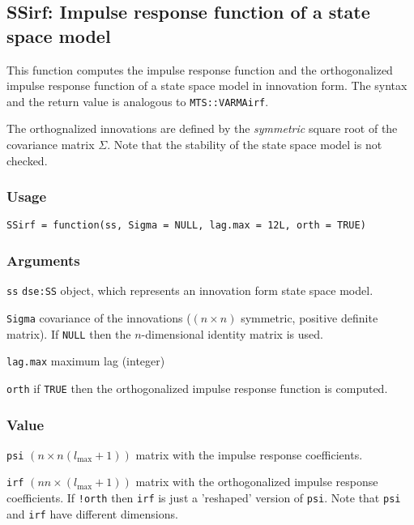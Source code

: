 \documentclass[]{article}
\begin{document}
\subsection{SSirf: Impulse response function of a state space
model}\label{ssirf-impulse-response-function-of-a-state-space-model}

This function computes the impulse response function and the
orthogonalized impulse response function of a state space model in
innovation form. The syntax and the return value is analogous to
\texttt{MTS::VARMAirf}.

The orthognalized innovations are defined by the \emph{symmetric} square
root of the covariance matrix \(\Sigma\). Note that the stability of the
state space model is not checked.

\subsubsection*{Usage}\begin{verbatim}
SSirf = function(ss, Sigma = NULL, lag.max = 12L, orth = TRUE)
\end{verbatim}\subsubsection*{Arguments}\begin{description}
\item \texttt{ss} \texttt{dse:SS} object, which represents an innovation
           form state space model.
\item \texttt{Sigma} covariance of the innovations 
             ($(n\times n)$ symmetric, positive definite matrix).
             If \texttt{NULL} then the $n$-dimensional identity matrix is used.
\item \texttt{lag.max} maximum lag (integer)
\item \texttt{orth} if \texttt{TRUE} then the orthogonalized impulse response 
             function is computed.
\end{description}\subsubsection*{Value}\begin{description}
\item \texttt{psi} $(n\times n(l_{\mbox{max}}+1))$ matrix with the 
       impulse response coefficients.
\item \texttt{irf} $(nn\times (l_{\mbox{max}}+1))$ matrix with the 
       orthogonalized impulse response coefficients. If \texttt{!orth} 
       then \texttt{irf} is just a 'reshaped' version of \texttt{psi}.
       Note that \texttt{psi} and \texttt{irf} have different dimensions.
\end{description}
\end{document}
